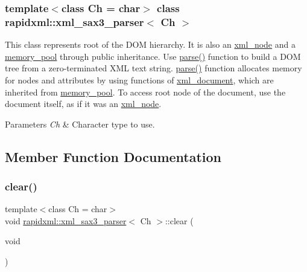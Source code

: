 \subsubsection*{template$<$class Ch = char$>$\newline
class rapidxml\+::xml\+\_\+sax3\+\_\+parser$<$ Ch $>$}

This class represents root of the D\+OM hierarchy. It is also an \hyperlink{classrapidxml_1_1xml__node}{xml\+\_\+node} and a \hyperlink{classrapidxml_1_1memory__pool}{memory\+\_\+pool} through public inheritance. Use \hyperlink{classrapidxml_1_1xml__sax3__parser_a9195e59c16ee5bec5a0d68bea48111fe}{parse()} function to build a D\+OM tree from a zero-\/terminated X\+ML text string. \hyperlink{classrapidxml_1_1xml__sax3__parser_a9195e59c16ee5bec5a0d68bea48111fe}{parse()} function allocates memory for nodes and attributes by using functions of \hyperlink{classrapidxml_1_1xml__document}{xml\+\_\+document}, which are inherited from \hyperlink{classrapidxml_1_1memory__pool}{memory\+\_\+pool}. To access root node of the document, use the document itself, as if it was an \hyperlink{classrapidxml_1_1xml__node}{xml\+\_\+node}. 
\begin{DoxyParams}{Parameters}
{\em Ch} & Character type to use. \\
\hline
\end{DoxyParams}


\subsection{Member Function Documentation}
\mbox{\label{classrapidxml_1_1xml__sax3__parser_a94691160be027ce7160efc1af6267c79}} 
\subsubsection{\texorpdfstring{clear()}{clear()}}
{\footnotesize\ttfamily template$<$class Ch  = char$>$ \\
void \hyperlink{classrapidxml_1_1xml__sax3__parser}{rapidxml\+::xml\+\_\+sax3\+\_\+parser}$<$ Ch $>$\+::clear (\begin{DoxyParamCaption}\item[{void}]{ }\end{DoxyParamCaption})\hspace{0.3cm}{\ttfamily [inline]}}

